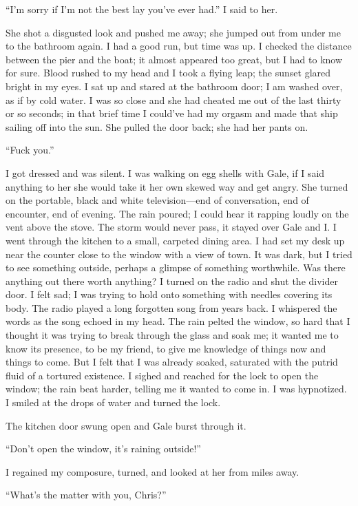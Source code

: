 ``I'm sorry if I'm not the best lay you've ever had.'' I said to her.

She shot a disgusted look and pushed me away; she jumped out from under
me to the bathroom again. I had a good run, but time was up. I checked
the distance between the pier and the boat; it almost appeared too
great, but I had to know for sure. Blood rushed to my head and I took a
flying leap; the sunset glared bright in my eyes. I sat up and stared at
the bathroom door; I am washed over, as if by cold water. I was so close
and she had cheated me out of the last thirty or so seconds; in that
brief time I could've had my orgasm and made that ship sailing off into
the sun. She pulled the door back; she had her pants on.

``Fuck you.''

I got dressed and was silent. I was walking on egg shells with Gale, if
I said anything to her she would take it her own skewed way and get
angry. She turned on the portable, black and white television---end of
conversation, end of encounter, end of evening. The rain poured; I could
hear it rapping loudly on the vent above the stove. The storm would
never pass, it stayed over Gale and I. I went through the kitchen to a
small, carpeted dining area. I had set my desk up near the counter close
to the window with a view of town. It was dark, but I tried to see
something outside, perhaps a glimpse of something worthwhile. Was there
anything out there worth anything? I turned on the radio and shut the
divider door. I felt sad; I was trying to hold onto something with
needles covering its body. The radio played a long forgotten song from
years back. I whispered the words as the song echoed in my head. The
rain pelted the window, so hard that I thought it was trying to break
through the glass and soak me; it wanted me to know its presence, to be
my friend, to give me knowledge of things now and things to come. But I
felt that I was already soaked, saturated with the putrid fluid of a
tortured existence. I sighed and reached for the lock to open the
window; the rain beat harder, telling me it wanted to come in. I was
hypnotized. I smiled at the drops of water and turned the lock.

The kitchen door swung open and Gale burst through it.

``Don't open the window, it's raining outside!''

I regained my composure, turned, and looked at her from miles away.

``What's the matter with you, Chris?''

